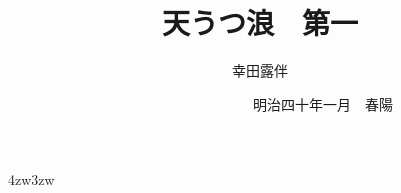 \documentclass[dvipdfmx,uplatex-dev,tate,book,paper=a5,jafontsize=12pt,
    open_bracket_pos=nibu_tentsuki,hanging_punctuation]{jlreq}
\title{\Huge 天うつ浪　{\Large 第一}}
\author{幸田露伴}
\date{　　　　　　　　　{\small 明治四十年一月}　春陽{\GWI{hkcs_m5802}}}
\begin{document}
\maketitle
\pagestyle{myheadings}
\newcommand{\Entry}[1]{
	\section*{#1}
	\markboth{#1}{#1}
	\setcounter{equation}{0}}
\begin{indentation}{4zw}{3zw}
\parindent=0pt

\newpage
\　%
\newpage










































\end{indentation}
\end{document}
